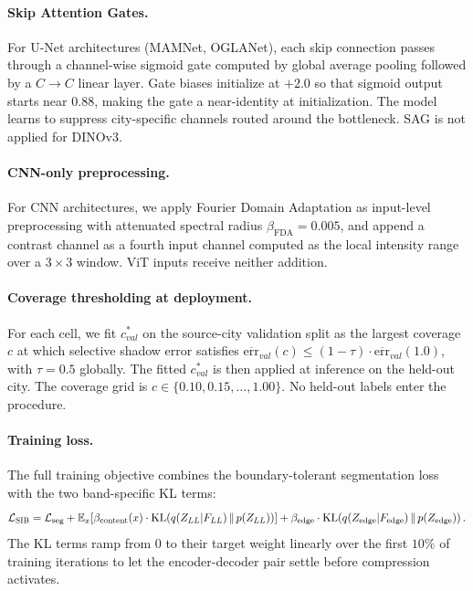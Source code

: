 \paragraph{Skip Attention Gates.} For U-Net architectures (MAMNet, OGLANet), each skip connection passes through a channel-wise sigmoid gate computed by global average pooling followed by a $C \to C$ linear layer. Gate biases initialize at $+2.0$ so that sigmoid output starts near $0.88$, making the gate a near-identity at initialization. The model learns to suppress city-specific channels routed around the bottleneck. SAG is not applied for DINOv3.

\paragraph{CNN-only preprocessing.} For CNN architectures, we apply Fourier Domain Adaptation as input-level preprocessing with attenuated spectral radius $\beta_{\text{FDA}} = 0.005$, and append a contrast channel as a fourth input channel computed as the local intensity range over a $3{\times}3$ window. ViT inputs receive neither addition.

\paragraph{Coverage thresholding at deployment.} For each cell, we fit $c^*_{val}$ on the source-city validation split as the largest coverage $c$ at which selective shadow error satisfies $\overline{\text{err}}_{val}(c) \leq (1-\tau) \cdot \overline{\text{err}}_{val}(1.0)$, with $\tau = 0.5$ globally. The fitted $c^*_{val}$ is then applied at inference on the held-out city. The coverage grid is $c \in \{0.10, 0.15, \ldots, 1.00\}$. No held-out labels enter the procedure.

\paragraph{Training loss.} The full training objective combines the boundary-tolerant segmentation loss with the two band-specific KL terms:
\begin{equation}
\mathcal{L}_{\textsc{SIB}} = \mathcal{L}_{\text{seg}} + \mathbb{E}_x\!\left[\beta_{\text{content}}(x) \cdot \text{KL}\!\left(q(Z_{LL}|F_{LL}) \,\|\, p(Z_{LL})\right)\right] + \beta_{\text{edge}} \cdot \text{KL}\!\left(q(Z_{\text{edge}}|F_{\text{edge}}) \,\|\, p(Z_{\text{edge}})\right).
\end{equation}
The KL terms ramp from $0$ to their target weight linearly over the first $10\%$ of training iterations to let the encoder-decoder pair settle before compression activates.

